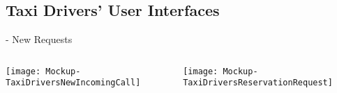 \documentclass[9pt]{beamer}
\makeatletter
\newcommand*{\currentname}{\@currentlabelname}
\makeatother
\begin{document}
\subsection{Taxi Drivers' User Interfaces}
\begin{frame}{\currentname{} - New Requests}
\begin{columns}[c]
  \begin{column}{.5\textwidth}
		\texttt{[image: Mockup-TaxiDriversNewIncomingCall]}
		\centering
  \end{column}
  \begin{column}{.5\textwidth}
    \texttt{[image: Mockup-TaxiDriversReservationRequest]}
		\centering
  \end{column}
\end{columns}
\end{frame}
\end{document}
